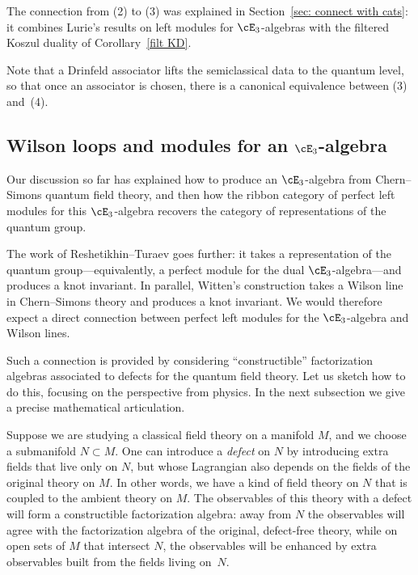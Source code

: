 \documentclass[10pt]{amsart}
\begin{document}
The connection from (2) to (3) was explained in Section~\ref{sec: connect with cats}: it combines Lurie's results on left modules for  $\cE_3$-algebras with the filtered Koszul duality of Corollary~\ref{filt KD}.

\begin{rmk}
Note that a Drinfeld associator lifts the semiclassical data to the quantum level,
so that once an associator is chosen, there is a canonical equivalence between (3) and~(4).
\end{rmk}

\subsection{Wilson loops and modules for an $\cE_3$-algebra}
\label{sec: wilson loop and fermions}

Our discussion so far has explained how to produce an $\cE_3$-algebra from Chern--Simons quantum field theory, 
and then how the ribbon category of perfect left modules for this $\cE_3$-algebra recovers the category of representations of the quantum group.

The work of Reshetikhin--Turaev goes further: 
it takes a representation of the quantum group---equivalently, a perfect module for the dual $\cE_3$-algebra---and produces a knot invariant. 
In parallel, Witten's construction takes a Wilson line in Chern--Simons theory and produces a knot invariant.  
We would therefore expect a direct connection between perfect left modules for the $\cE_3$-algebra and Wilson lines.

Such a connection is provided by considering ``constructible'' factorization algebras associated to defects for the quantum field theory. 
Let us sketch how to do this, 
focusing on the perspective from physics.
In the next subsection we give a precise mathematical articulation.

Suppose we are studying a classical field theory on a manifold $M$, and we choose a submanifold $N \subset M$.  
One can introduce a {\it defect} on $N$ by introducing extra fields that live only on $N$, 
but whose Lagrangian also depends on the fields of the original theory on $M$. 
In other words, we have a kind of field theory on $N$ that is coupled to the ambient theory on $M$.
The observables of this theory with a defect will form a constructible factorization algebra: 
away from $N$ the observables will agree with the factorization algebra of the original, defect-free theory, 
while on open sets of $M$ that intersect $N$, 
the observables will be enhanced by extra observables built from the fields living on~$N$.   
\end{document}
